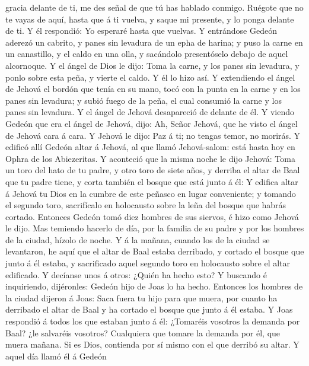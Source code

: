 gracia delante de ti, me des señal de que tú has hablado conmigo.
 Ruégote que no te vayas de aquí, hasta que á ti vuelva,
y saque mi presente, y lo ponga delante de ti. Y él respondió: Yo
esperaré hasta que vuelvas.  Y entrándose Gedeón aderezó
un cabrito, y panes sin levadura de un epha de harina; y puso la carne
en un canastillo, y el caldo en una olla, y sacándolo presentóselo
debajo de aquel alcornoque.  Y el ángel de Dios le dijo:
Toma la carne, y los panes sin levadura, y ponlo sobre esta peña, y
vierte el caldo. Y él lo hizo así.  Y extendiendo el
ángel de Jehová el bordón que tenía en su mano, tocó con la punta en la
carne y en los panes sin levadura; y subió fuego de la peña, el cual
consumió la carne y los panes sin levadura. Y el ángel de Jehová
desapareció de delante de él.  Y viendo Gedeón que era el
ángel de Jehová, dijo: Ah, Señor Jehová, que he visto el ángel de Jehová
cara á cara.  Y Jehová le dijo: Paz á ti; no tengas
temor, no morirás.  Y edificó allí Gedeón altar á Jehová,
al que llamó Jehová-salom: está hasta hoy en Ophra de los Abiezeritas.
 Y aconteció que la misma noche le dijo Jehová: Toma un
toro del hato de tu padre, y otro toro de siete años, y derriba el altar
de Baal que tu padre tiene, y corta también el bosque que está junto á
él:  Y edifica altar á Jehová tu Dios en la cumbre de
este peñasco en lugar conveniente; y tomando el segundo toro,
sacrifícalo en holocausto sobre la leña del bosque que habrás cortado.
 Entonces Gedeón tomó diez hombres de sus siervos, é hizo
como Jehová le dijo. Mas temiendo hacerlo de día, por la familia de su
padre y por los hombres de la ciudad, hízolo de noche.  Y
á la mañana, cuando los de la ciudad se levantaron, he aquí que el altar
de Baal estaba derribado, y cortado el bosque que junto á él estaba, y
sacrificado aquel segundo toro en holocausto sobre el altar edificado.
 Y decíanse unos á otros: ¿Quién ha hecho esto? Y
buscando é inquiriendo, dijéronles: Gedeón hijo de Joas lo ha hecho.
Entonces los hombres de la ciudad dijeron á Joas:  Saca
fuera tu hijo para que muera, por cuanto ha derribado el altar de Baal y
ha cortado el bosque que junto á él estaba.  Y Joas
respondió á todos los que estaban junto á él: ¿Tomaréis vosotros la
demanda por Baal? ¿le salvaréis vosotros? Cualquiera que tomare la
demanda por él, que muera mañana. Si es Dios, contienda por sí mismo con
el que derribó su altar.  Y aquel día llamó él á Gedeón
